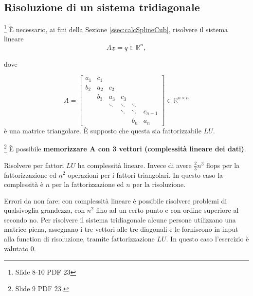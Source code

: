 \subsection{Risoluzione di un sistema tridiagonale}\label{ssec:risSistTridiag}

\noindent\footnote{Slide 8-10 PDF 23} È necessario, ai fini della Sezione \ref{ssec:calcSplineCub}, risolvere il sistema lineare
\begin{equation*}
    A\underline{x}=\underline{q}\in\mathbb{R}^n,
\end{equation*}

\noindent dove

\begin{equation*}
    A=
    \begin{bmatrix}
        a_1 & c_1 & & & &\\
        b_2 & a_2 & c_2 & & &\\
            & b_3 & a_3 & c_3 & &\\
            & & \ddots &\ddots & \ddots &\\
            & & & \ddots & \ddots & c_{n-1}\\
            & & & &  b_n & a_n
    \end{bmatrix}
    \in\mathbb{R}^{n\times n}
\end{equation*}
è una matrice triangolare. È supposto che questa sia fattorizzabile $LU$.

\begin{remark}\footnote{Slide 9 PDF 23.}
    È possibile \textbf{memorizzare $\boldsymbol A$ con 3 vettori (complessità lineare dei dati)}.
\end{remark}

\noindent Risolvere per fattori $LU$ ha complessità lineare. Invece di avere $\frac{2}{3}n^3$ flops per la fattorizzazione ed $n^2$ operazioni per i fattori triangolari. In questo caso la complessità è $n$ per la fattorizzazione ed $n$ per la risoluzione.

\noindent Errori da non fare: con complessità lineare è possibile risolvere problemi di qualsivoglia grandezza, con $n^2$ fino ad un certo punto e con ordine superiore al secondo no. Per risolvere il sistema tridiagonale alcune persone utilizzano una matrice piena, assegnano i tre vettori alle tre diagonali e le forniscono in input alla function di risoluzione, tramite fattorizzazione $LU$. In questo caso l'esercizio è valutato 0.

